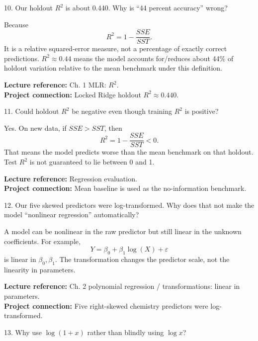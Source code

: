 \documentclass[10.5pt,a4paper]{article}
\newcommand{\chapref}[1]{\textbf{Lecture reference:} #1}
\newcommand{\projectref}[1]{\textbf{Project connection:} #1}
\begin{document}
\begin{qbox}{10. Our holdout $R^2$ is about 0.440. Why is ``44 percent accuracy'' wrong?}
\end{qbox}
\begin{answerbox}Because
\[
R^2=1-\frac{SSE}{SST}.
\]
It is a relative squared-error measure, not a percentage of exactly correct predictions. \(R^2\approx0.44\) means the model accounts for/reduces about 44\% of holdout variation relative to the mean benchmark under this definition.\end{answerbox}
\begin{refbox}\chapref{Ch. 1 MLR: $R^2$.}\\\projectref{Locked Ridge holdout $R^2\approx0.440$.}\end{refbox}
\begin{qbox}{11. Could holdout $R^2$ be negative even though training $R^2$ is positive?}
\end{qbox}
\begin{answerbox}Yes. On new data, if \(SSE>SST\), then
\[
R^2=1-\frac{SSE}{SST}<0.
\]
That means the model predicts worse than the mean benchmark on that holdout. Test \(R^2\) is not guaranteed to lie between 0 and 1.\end{answerbox}
\begin{refbox}\chapref{Regression evaluation.}\\\projectref{Mean baseline is used as the no-information benchmark.}\end{refbox}
\begin{qbox}{12. Our five skewed predictors were log-transformed. Why does that not make the model ``nonlinear regression'' automatically?}
\end{qbox}
\begin{answerbox}A model can be nonlinear in the raw predictor but still linear in the unknown coefficients. For example,
\[
Y=\beta_0+\beta_1\log(X)+\varepsilon
\]
is linear in \(\beta_0,\beta_1\). The transformation changes the predictor scale, not the linearity in parameters.\end{answerbox}
\begin{refbox}\chapref{Ch. 2 polynomial regression / transformations: linear in parameters.}\\\projectref{Five right-skewed chemistry predictors were log-transformed.}\end{refbox}
\begin{qbox}{13. Why use $\log(1+x)$ rather than blindly using $\log x$?}
\end{qbox}
\end{document}
